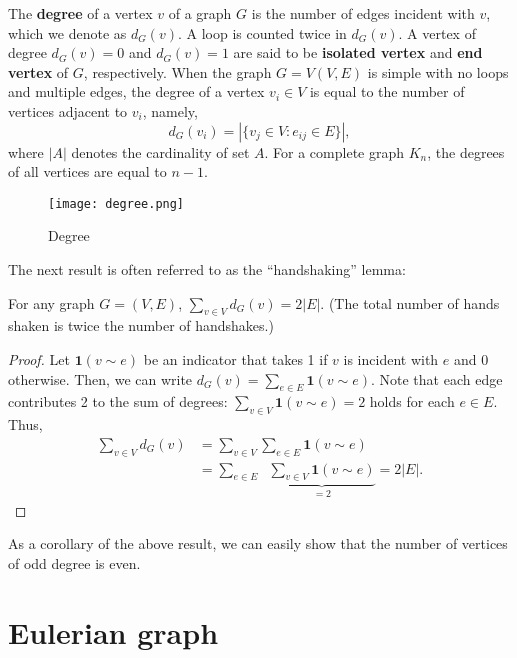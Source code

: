\documentclass[11pt, A4paper, openany, uplatex]{book}
\begin{document}
\begin{appendices}
The \textbf{degree} of a vertex $v$ of a graph $G$ is the number of edges incident with $v$, which we denote as $d_G(v)$.
A loop is counted twice in $d_G(v)$.
A vertex of degree $d_G(v) = 0$ and $d_G(v) = 1$ are said to be \textbf{isolated vertex} and \textbf{end vertex} of $G$, respectively.
When the graph $G = V(V, E)$ is simple with no loops and multiple edges, the degree of a vertex $v_i \in V$ is equal to the number of vertices adjacent to $v_i$, namely,
\[
	d_G(v_i) = | \{v_j \in V : e_{ij}\in E\} |,
\]
where $| A |$ denotes the cardinality of set $A$.
For a complete graph $K_n$, the degrees of all vertices are equal to $n - 1$.

\begin{figure}[h!]
	\begin{center}
		\texttt{[image: degree.png]}
		\caption{Degree\label{fig:degree}}
	\end{center}
\end{figure}

The next result is often referred to as the ``handshaking'' lemma:
\begin{proposition}[Handshaking]\label{prop:handshake}
	For any graph $G = (V, E)$, $\sum_{v \in V} d_G(v) = 2 | E |$.
	(The total number of hands shaken is twice the number of handshakes.)
\end{proposition}

\begin{proof}
	Let $\mathbf{1}(v \sim e)$ be an indicator that takes 1 if $v$ is incident with $e$ and 0 otherwise.
	Then, we can write $d_G(v) = \sum_{e \in E}\mathbf{1}(v \sim e)$.
	Note that each edge contributes 2 to the sum of degrees: $\sum_{v \in V}\mathbf{1}(v \sim e) = 2$ holds for each $e \in E$.
	Thus,
	\begin{align*}
		\sum_{v \in V} d_G(v) 
		& = \sum_{v \in V} \sum_{e \in E}\mathbf{1}(v \sim e) \\
		& = \sum_{e \in E} \;\; \underbrace{\sum_{v \in V} \mathbf{1}(v \sim e)}_{=2} = 2 |E|.
	\end{align*}
\end{proof}

As a corollary of the above result, we can easily show that the number of vertices of odd degree is even.

\section{Eulerian graph}


\end{appendices}
\end{document}
